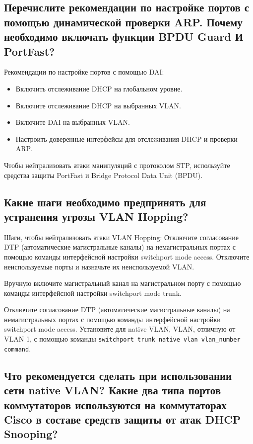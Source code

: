 \subsection{Перечислите рекомендации по настройке портов с помощью
динамической проверки ARP. Почему необходимо включать
функции BPDU Guard И PortFast?}

Рекомендации по настройке портов с помощью DAI:

\begin{itemize}
    \item Включить отслеживание DHCP на глобальном уровне.
    \item Включите отслеживание DHCP на выбранных VLAN.
    \item Включите DAI на выбранных VLAN.
    \item Настроить доверенные интерфейсы для отслеживания DHCP и
    проверки ARP.
\end{itemize}

Чтобы нейтрализовать атаки манипуляций с протоколом STP,
используйте средства защиты PortFast и Bridge Protocol Data Unit (BPDU).

\subsection{Какие шаги необходимо предпринять для устранения угрозы
VLAN Hopping?}

Шаги, чтобы нейтрализовать атаки VLAN Hopping:
Отключите согласование DTP (автоматические магистральные
каналы) на немагистральных портах с помощью команды
интерфейсной настройки switchport mode access.
Отключите неиспользуемые порты и назначьте их
неиспользуемой VLAN.\par
Вручную включите магистральный канал на магистральном
порту с помощью команды интерфейсной настройки switchport
mode trunk.\par
Отключите согласование DTP (автоматические магистральные
каналы) на немагистральных портах с помощью команды
интерфейсной настройки switchport mode access.
Установите для native VLAN, VLAN, отличную от VLAN 1, с
помощью команды \verb|switchport trunk native vlan vlan_number command|.

\subsection{Что рекомендуется сделать при использовании сети native
VLAN? Какие два типа портов коммутаторов используются на
коммутаторах Cisco в составе средств защиты от атак DHCP
Snooping?}

